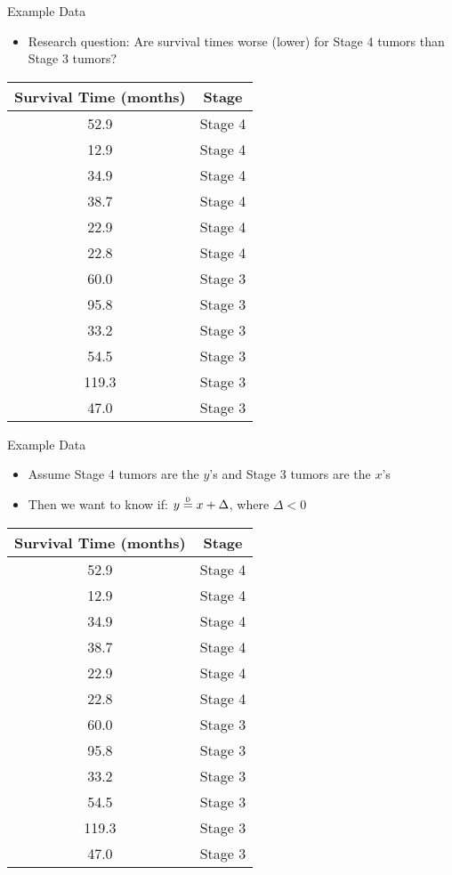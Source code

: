 \documentclass[xcolor=dvipsnames]{beamer}
\newcommand\myeq{\mathrel{\overset{\makebox[0pt]{\mbox{\normalfont\tiny\sffamily D}}}{=}}}
\begin{document}
\begin{frame}{Example Data}
\begin{itemize}
	\item Research question: Are survival times worse (lower) for Stage 4 tumors than Stage 3 tumors? 
\end{itemize}
\begin{center}
	\begin{tabular}{|c|c|}
		\hline
		\textbf{Survival Time (months)} &  \textbf{Stage} \\ \hline \hline
		52.9  &Stage 4 \\ \hline
		12.9 &Stage 4 \\ \hline
		34.9& Stage 4 \\ \hline
		38.7 &Stage 4 \\ \hline
		22.9& Stage 4 \\ \hline
		22.8 &Stage 4 \\ \hline
		60.0 &Stage 3 \\ \hline
		95.8& Stage 3 \\ \hline
		33.2 &Stage 3 \\ \hline
		54.5 &Stage 3 \\ \hline
		119.3 &Stage 3 \\ \hline
		47.0 &Stage 3 \\ \hline
	\end{tabular}
\end{center}
\end{frame}

\begin{frame}{Example Data}
\begin{itemize}
	\item Assume Stage 4 tumors are the $y$'s and Stage 3 tumors are the $x$'s
	\item Then we want to know if: $y \myeq x + \Delta$, where $\Delta < 0$
\end{itemize}
\begin{center}
	\begin{tabular}{|c|c|}
		\hline
		\textbf{Survival Time (months)} &  \textbf{Stage} \\ \hline \hline
		52.9  &Stage 4 \\ \hline
		12.9 &Stage 4 \\ \hline
		34.9& Stage 4 \\ \hline
		38.7 &Stage 4 \\ \hline
		22.9& Stage 4 \\ \hline
		22.8 &Stage 4 \\ \hline
		60.0 &Stage 3 \\ \hline
		95.8& Stage 3 \\ \hline
		33.2 &Stage 3 \\ \hline
		54.5 &Stage 3 \\ \hline
		119.3 &Stage 3 \\ \hline
		47.0 &Stage 3 \\ \hline
	\end{tabular}
\end{center}
\end{frame}
\end{document}
